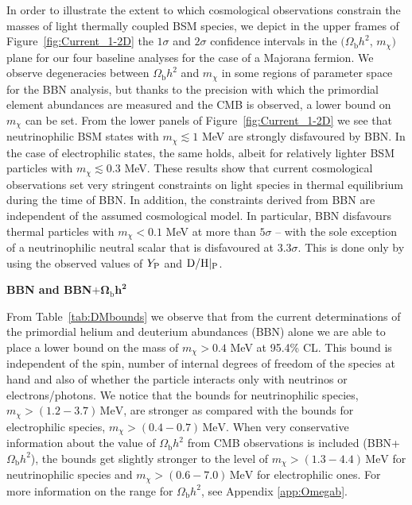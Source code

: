 In order to illustrate the extent to which cosmological observations constrain the masses of light thermally coupled BSM species, we depict in the upper frames of Figure~\ref{fig:Current_1-2D} the $1\sigma$ and $2\sigma$ confidence intervals in the $(\Omega_{\mathrm{b}}h^2$, $m_\chi)$ plane for our four baseline analyses for the case of a Majorana fermion. We observe degeneracies between $\Omega_{\mathrm{b}}h^2$ and $m_\chi$ in some regions of parameter space for the BBN analysis, but thanks to the precision with which the primordial element abundances are measured and the CMB is observed, a lower bound on $m_\chi$ can be set. From the lower panels of Figure~\ref{fig:Current_1-2D} we see that neutrinophilic BSM states with $m_\chi \lesssim 1$ MeV are strongly disfavoured by BBN. In the case of electrophilic states, the same holds, albeit for relatively lighter BSM particles with $m_\chi \lesssim 0.3$ MeV. These results show that current cosmological observations set very stringent constraints on light species in thermal equilibrium during the time of BBN. In addition, the constraints derived from BBN are independent of the assumed cosmological model. In particular, BBN disfavours thermal particles with $m_\chi < 0.1$ MeV at more than $5\sigma$ -- with the sole exception of a neutrinophilic neutral scalar that is disfavoured at $3.3\sigma$. This is done only by using the observed values of $Y_{\rm P}$ and ${\rm D/H}|_{\rm P}$.

\vspace{0.2cm}

\noindent\textbf{BBN and BBN}$\boldsymbol{+\Omega_{\mathrm{b}}h^2}$

\noindent From Table~\ref{tab:DMbounds} we observe that from the current determinations of the primordial helium and deuterium abundances (BBN) alone we are able to place a lower bound on the mass of $m_\chi >0.4$ MeV at 95.4\% CL. This bound is independent of the spin, number of internal degrees of freedom of the species at hand and also of whether the particle interacts only with neutrinos or electrons/photons. We notice that the bounds for neutrinophilic species, $m_\chi > (1.2-3.7)\,\text{MeV}$, are stronger as compared with the bounds for electrophilic species, $m_\chi > (0.4-0.7)\,\text{MeV}$. When very conservative information about the value of $\Omega_{\mathrm{b}}h^2$ from CMB observations is included (BBN+$\Omega_{\mathrm{b}}h^2$), the bounds get slightly stronger to the level of $m_\chi > (1.3-4.4)\,\text{MeV}$ for neutrinophilic species and $m_\chi > (0.6-7.0)\,\text{MeV}$ for electrophilic ones. For more information on the range for $\Omega_{\mathrm{b}}h^2$, see Appendix \ref{app:Omegab}.
\newpage

